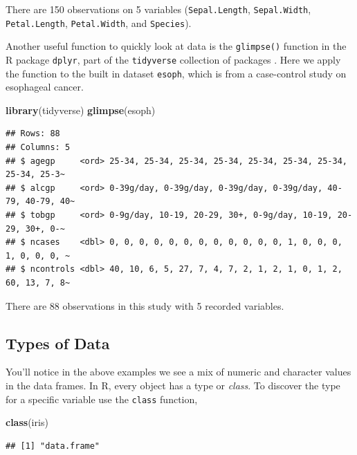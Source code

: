 \documentclass[
]{book}
\newenvironment{Shaded}{\begin{snugshade}}{\end{snugshade}}
\newcommand{\FunctionTok}[1]{\textcolor[rgb]{0.13,0.29,0.53}{\textbf{#1}}}
\newcommand{\NormalTok}[1]{#1}
\begin{document}
There are 150 observations on 5 variables (\texttt{Sepal.Length}, \texttt{Sepal.Width}, \texttt{Petal.Length}, \texttt{Petal.Width}, and \texttt{Species}).

Another useful function to quickly look at data is the \texttt{glimpse()} function in the R package \texttt{dplyr}, part of the \texttt{tidyverse} collection of packages \citep{R-tidyverse}. Here we apply the function to the built in dataset \texttt{esoph}, which is from a case-control study on esophageal cancer.

\begin{Shaded}
\begin{Highlighting}[]
\FunctionTok{library}\NormalTok{(tidyverse)}
\FunctionTok{glimpse}\NormalTok{(esoph)}
\end{Highlighting}
\end{Shaded}

\begin{verbatim}
## Rows: 88
## Columns: 5
## $ agegp     <ord> 25-34, 25-34, 25-34, 25-34, 25-34, 25-34, 25-34, 25-34, 25-3~
## $ alcgp     <ord> 0-39g/day, 0-39g/day, 0-39g/day, 0-39g/day, 40-79, 40-79, 40~
## $ tobgp     <ord> 0-9g/day, 10-19, 20-29, 30+, 0-9g/day, 10-19, 20-29, 30+, 0-~
## $ ncases    <dbl> 0, 0, 0, 0, 0, 0, 0, 0, 0, 0, 0, 0, 1, 0, 0, 0, 1, 0, 0, 0, ~
## $ ncontrols <dbl> 40, 10, 6, 5, 27, 7, 4, 7, 2, 1, 2, 1, 0, 1, 2, 60, 13, 7, 8~
\end{verbatim}

There are 88 observations in this study with 5 recorded variables.

\hypertarget{dataTypesSection}{%
\subsection{Types of Data}\label{dataTypesSection}}

You'll notice in the above examples we see a mix of numeric and character values in the data frames. In R, every object has a type or \emph{class}. To discover the type for a specific variable use the \texttt{class} function,

\begin{Shaded}
\begin{Highlighting}[]
\FunctionTok{class}\NormalTok{(iris)}
\end{Highlighting}
\end{Shaded}

\begin{verbatim}
## [1] "data.frame"
\end{verbatim}
\end{document}
